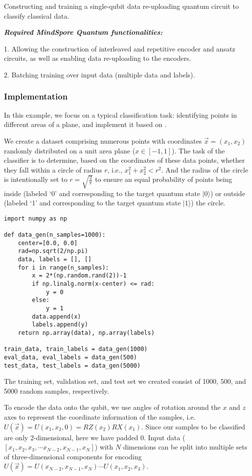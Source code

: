 Constructing and training a single-qubit data re-uploading quantum circuit to classify classical data.

\textbf{\textit{Required MindSpore Quantum functionalities:}}

1. Allowing the construction of interleaved and repetitive encoder and ansatz circuits, as well as enabling data re-uploading to the encoders.

2. Batching training over input data (multiple data and labels).

\subsubsection{Implementation}

In this example, we focus on a typical classification task: identifying points in different areas of a plane, and implement it based on \MindQuantum.

We create a dataset comprising numerous points with coordinates $\overrightarrow{x}=(x_1, x_2)$ randomly distributed on a unit area plane ($x\in[-1,1]$).
The task of the classifier is to determine, based on the coordinates of these data points, whether they fall within a circle of radius $r$, i.e., $x_1^2+x_2^2<r^2$.
And the radius of the circle is intentionally set to $r=\sqrt{\frac{2}{\pi}}$ to ensure an equal probability of points being inside (labeled `0' and corresponding to the target quantum state $|0\rangle$) or outside (labeled `1' and corresponding to the target quantum state $|1\rangle$) the circle.

\begin{lstlisting}
import numpy as np

def data_gen(n_samples=1000):
    center=[0.0, 0.0]
    rad=np.sqrt(2/np.pi)
    data, labels = [], []
    for i in range(n_samples):
        x = 2*(np.random.rand(2))-1
        if np.linalg.norm(x-center) <= rad:
            y = 0
        else:
            y = 1
        data.append(x)
        labels.append(y)
    return np.array(data), np.array(labels)

train_data, train_labels = data_gen(1000)
eval_data, eval_labels = data_gen(500)
test_data, test_labels = data_gen(5000)
\end{lstlisting}

The training set, validation set, and test set we created consist of 1000, 500, and 5000 random samples, respectively.

To encode the data onto the qubit, we use angles of rotation around the $x$ and $z$ axes to represent the coordinate information of the samples, i.e. $U(\overrightarrow{x})=U(x_1,x_2,0)=RZ(x_2)RX(x_1)$. Since our samples to be classified are only 2-dimensional, here we have padded 0.
Input data ($[x_1, x_2, x_3, \cdots x_{N-2}, x_{N-1},x_{N}]$) with $N$ dimensions can be split into multiple sets of three-dimensional components for encoding $U(\overrightarrow{x})=U(x_{N-2},x_{N-1},x_{N})\cdots U(x_1,x_2,x_3)$.

